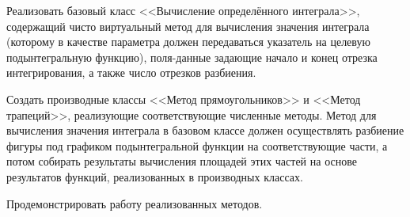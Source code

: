 Реализовать базовый класс <<Вычисление определённого
интеграла>>, содержащий чисто виртуальный метод для
вычисления значения интеграла (которому в качестве
		параметра должен передаваться указатель на целевую
		подынтегральную функцию), поля-данные задающие начало
и конец отрезка интегрирования, а также число отрезков
разбиения.

Создать производные классы <<Метод
прямоугольников>> и <<Метод трапеций>>, реализующие
соответствующие численные методы. Метод для вычисления
значения интеграла в базовом классе должен осуществлять
разбиение фигуры под графиком подынтегральной функции
на соответствующие части, а потом собирать результаты
вычисления площадей этих частей на основе результатов
функций, реализованных в производных классах.

Продемонстрировать работу реализованных методов.
